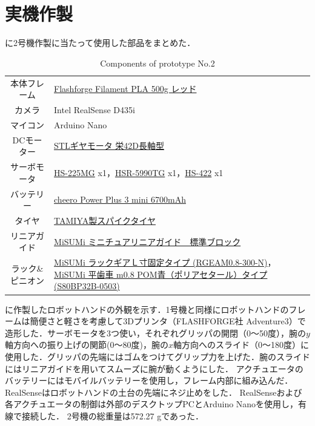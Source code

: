 \section{実機作製}

に2号機作製に当たって使用した部品をまとめた．

\begin{table}[H]
    \centering
    \caption{Components of prototype No.2}
    \begin{tabular}{cp{0.7\hsize}}\toprule
        本体フレーム & \href{http://flashforge.shop-pro.jp/?pid=76863013}{Flashforge Filament PLA 500g レッド} \\
        カメラ & Intel RealSense D435i \\ 
        マイコン & Arduino Nano \\ 
        DCモーター & \href{http://akizukidenshi.com/catalog/g/gM-12379/}{STLギヤモータ 栄42D長軸型} \\ 
        サーボモータ & \href{https://hitecrcd.co.jp/products/servo32225/}{HS-225MG} x1，\href{https://hitecrcd.com/products/servos/discontinued-servos-servo-accessories/hsr-5990tg-hmi-ultra-premium-robot-servo/product}{HSR-5990TG} x1，\href{https://hitecrcd.co.jp/products/servo31422s/}{HS-422} x1 \\ 
        バッテリー & \href{https://cheero.net/powerplus3mini/}{cheero Power Plus 3 mini 6700mAh} \\ 
        タイヤ & \href{https://tamiya.com/japan/products/70194/index.html}{TAMIYA製スパイクタイヤ} \\
        リニアガイド & \href{https://jp.misumi-ec.com/vona2/detail/110302586530/}{MiSUMi ミニチュアリニアガイド　標準ブロック} \\
        ラック\&ピニオン & \href{https://jp.misumi-ec.com/vona2/detail/110300429830/?HissuCode=RGEAM0.8-300-N}{MiSUMi ラックギアＬ寸固定タイプ (RGEAM0.8-300-N)}，\href{https://jp.misumi-ec.com/vona2/detail/221006385074/?HissuCode=S80BP32B-0503}{MiSUMi 平歯車 m0.8 POM青（ポリアセタール）タイプ (S80BP32B-0503)}  \\ \bottomrule
    \end{tabular} 
    \label{tab:2号機部品}
\end{table}

に作製したロボットハンドの外観を示す．1号機と同様にロボットハンドのフレームは簡便さと軽さを考慮して3Dプリンタ（FLASHFORGE社 Adventure3）で造形した．サーボモータを3つ使い，それぞれグリッパの開閉（0〜50度），腕の$y$軸方向への振り上げの関節(0〜80度)，腕の$x$軸方向へのスライド（0〜180度）に使用した．グリッパの先端にはゴムをつけてグリップ力を上げた．腕のスライドにはリニアガイドを用いてスムーズに腕が動くようにした．
アクチュエータのバッテリーにはモバイルバッテリーを使用し，フレーム内部に組み込んだ．RealSenseはロボットハンドの土台の先端にネジ止めをした．
RealSenseおよび各アクチュエータの制御は外部のデスクトップPCとArduino Nanoを使用し，有線で接続した．
2号機の総重量は572.27 gであった．

